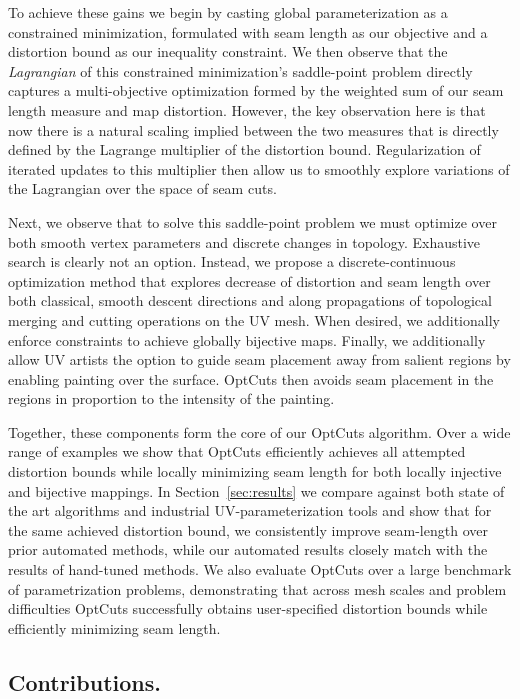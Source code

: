   To achieve these gains we begin by casting global parameterization as a constrained minimization, formulated with seam length as our objective and a distortion bound as our inequality constraint. We then observe that the \emph{Lagrangian} of this constrained minimization's saddle-point problem directly captures a multi-objective optimization formed by the weighted sum of our seam length measure and map distortion. However, the key observation here is that now there is a natural scaling implied between the two measures that is directly defined by the Lagrange multiplier of the distortion bound. Regularization of iterated updates to this multiplier then allow us to smoothly explore variations of the Lagrangian over the space of seam cuts. 
  
  Next, we observe that to solve this saddle-point problem we must optimize over both smooth vertex parameters and discrete changes in topology. Exhaustive search is clearly not an option. Instead, we propose a discrete-continuous optimization method that explores decrease of distortion and seam length over both classical, smooth descent directions and along propagations of topological merging and cutting operations on the UV mesh. When desired, we additionally enforce constraints to achieve globally bijective maps. Finally, we additionally allow UV artists the option to guide seam placement away from salient regions by enabling painting over the surface. OptCuts then avoids seam placement in the regions in proportion to the intensity of the painting.
  
  Together, these components form the core of our OptCuts algorithm. Over a wide range of examples we show that OptCuts efficiently achieves all attempted distortion bounds while locally minimizing seam length for both locally injective and bijective mappings. In Section~\ref{sec:results} we compare against both state of the art algorithms and industrial UV-parameterization tools and show that for the same achieved distortion bound, we consistently improve seam-length over prior automated methods, while our automated results closely match with the results of hand-tuned methods. We also evaluate OptCuts over a large benchmark of parametrization problems, demonstrating that across mesh scales and problem difficulties OptCuts successfully obtains user-specified distortion bounds while efficiently minimizing seam length. 
  
\subsection{Contributions.}

